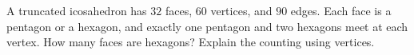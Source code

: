 A truncated icosahedron has $32$ faces, $60$ vertices, and $90$ edges. Each face is a pentagon or a hexagon, and exactly one pentagon and two hexagons meet at each vertex. How many faces are hexagons? Explain the counting using vertices.
